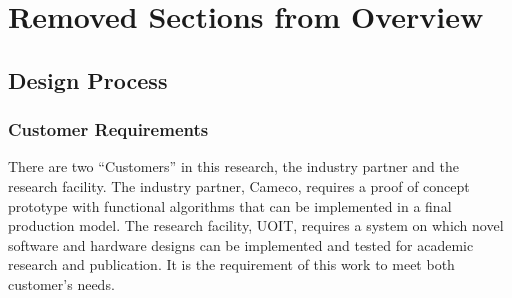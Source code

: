 \chapter{Removed Sections from Overview}
\label{chap:removed}
\section{Design Process}
\label{sec:design}
\subsection{Customer Requirements}
There are two ``Customers'' in this research, the industry partner and the research facility. The industry partner, Cameco, requires a proof of concept prototype with functional algorithms that can be implemented in a final production model. The research facility, UOIT, requires a system on which novel software and hardware designs can be implemented and tested for academic research and publication. It is the requirement of this work to meet both customer's needs.\\

